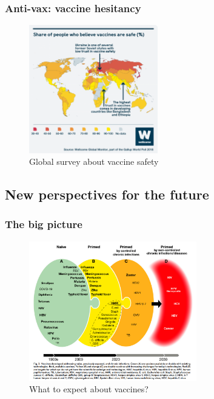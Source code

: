 \begin{frame}
    \frametitle{Anti-vax: vaccine hesitancy}
    \begin{figure}
        \centering
        \includegraphics[width=0.5\textwidth]{imgs/VaccineHesitancy.png}
        \caption{Global survey about vaccine safety \autocite{SurveyRevealsEuropean}}
        \label{fig:responses8}
    \end{figure}
\end{frame}

\subsection{New perspectives for the future}

\begin{frame}
    \frametitle{The big picture}
    \begin{figure}
        \centering
        \includegraphics[width=0.65\textwidth]{imgs/vaccineEvolution.PNG}
        \caption{What to expect about vaccines? \autocite{rappuoliVaccinologyPostCOVID192021}}
        \label{fig:responses13}
    \end{figure}
\end{frame}





